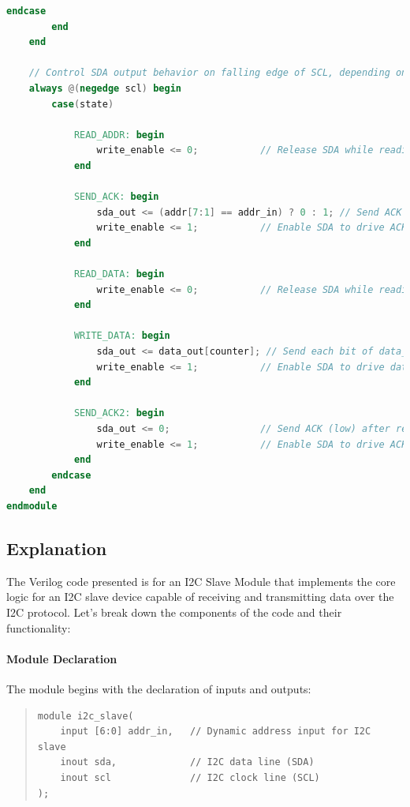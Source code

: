 \documentclass[a4paper,12pt]{report}
\begin{document}
\begin{lstlisting}[language=Verilog, caption={I2C Slave Module in Verilog}, label=lst:i2c_slave]
            endcase
        end
    end

    // Control SDA output behavior on falling edge of SCL, depending on the state
    always @(negedge scl) begin
        case(state)
            
            READ_ADDR: begin
                write_enable <= 0;           // Release SDA while reading address
            end
            
            SEND_ACK: begin
                sda_out <= (addr[7:1] == addr_in) ? 0 : 1; // Send ACK (low) if address matches, else NACK (high)
                write_enable <= 1;           // Enable SDA to drive ACK/NACK
            end
            
            READ_DATA: begin
                write_enable <= 0;           // Release SDA while reading data
            end
            
            WRITE_DATA: begin
                sda_out <= data_out[counter]; // Send each bit of data_out on SDA
                write_enable <= 1;           // Enable SDA to drive data
            end
            
            SEND_ACK2: begin
                sda_out <= 0;                // Send ACK (low) after receiving data
                write_enable <= 1;           // Enable SDA to drive ACK
            end
        endcase
    end
endmodule
\end{lstlisting}
\newpage
\subsection{Explanation}

The Verilog code presented is for an I2C Slave Module that implements the core logic for an I2C slave device capable of receiving and transmitting data over the I2C protocol. Let’s break down the components of the code and their functionality:

\paragraph{Module Declaration}
The module begins with the declaration of inputs and outputs:

\begin{quote}
\begin{verbatim}
module i2c_slave(
    input [6:0] addr_in,   // Dynamic address input for I2C slave
    inout sda,             // I2C data line (SDA)
    inout scl              // I2C clock line (SCL)
);
\end{verbatim}
\end{quote}
\end{document}
